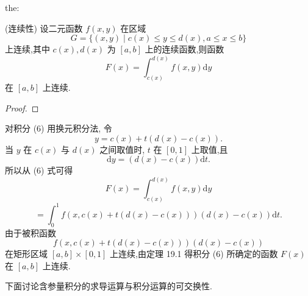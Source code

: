 \begin{theorem}{}{the:}

\end{theorem}
 (连续性) 设二元函数 \(f\left( {x,y}\right)\) 在区域
\[
G = \{ \left( {x,y}\right)  \mid  c\left( x\right)  \leq  y \leq  d\left( x\right) ,a \leq  x \leq  b\}
\]
上连续,其中 \(c\left( x\right) ,d\left( x\right)\) 为 \(\left\lbrack  {a,b}\right\rbrack\) 上的连续函数,则函数
\[
F\left( x\right)  = {\int }_{c\left( x\right) }^{d\left( x\right) }f\left( {x,y}\right) \mathrm{d}y \tag{6}
\]
在 \(\left\lbrack  {a,b}\right\rbrack\) 上连续.

\begin{proof}

\end{proof}
对积分 (6) 用换元积分法, 令
\[
y = c\left( x\right)  + t\left( {d\left( x\right)  - c\left( x\right) }\right) .
\]
当 \(y\) 在 \(c\left( x\right)\) 与 \(d\left( x\right)\) 之间取值时, \(t\) 在 \(\left\lbrack  {0,1}\right\rbrack\) 上取值,且
\[
\mathrm{d}y = \left( {d\left( x\right)  - c\left( x\right) }\right) \mathrm{d}t.
\]
所以从 (6) 式可得
\[
F\left( x\right)  = {\int }_{c\left( x\right) }^{d\left( x\right) }f\left( {x,y}\right) \mathrm{d}y
\]
\[
= {\int }_{0}^{1}f\left( {x,c\left( x\right)  + t\left( {d\left( x\right)  - c\left( x\right) }\right) }\right) \left( {d\left( x\right)  - c\left( x\right) }\right) \mathrm{d}t.
\]
由于被积函数
\[
f\left( {x,c\left( x\right)  + t\left( {d\left( x\right)  - c\left( x\right) }\right) }\right) \left( {d\left( x\right)  - c\left( x\right) }\right)
\]
在矩形区域 \(\left\lbrack  {a,b}\right\rbrack   \times  \left\lbrack  {0,1}\right\rbrack\) 上连续,由定理 19.1 得积分 (6) 所确定的函数 \(F\left( x\right)\) 在 \(\left\lbrack  {a,b}\right\rbrack\) 上连续.

下面讨论含参量积分的求导运算与积分运算的可交换性.

